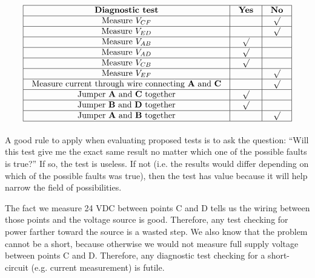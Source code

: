 $$\vbox{\offinterlineskip
\halign{\strut
\vrule \quad\hfil # \ \hfil & 
\vrule \quad\hfil # \ \hfil & 
\vrule \quad\hfil # \ \hfil \vrule \cr
\noalign{\hrule}
%
{\bf Diagnostic test} & {\bf Yes} & {\bf No} \cr
%
\noalign{\hrule}
%
Measure $V_{CF}$ &  & $\surd$ \cr
%
\noalign{\hrule}
%
Measure $V_{ED}$ &  & $\surd$ \cr
%
\noalign{\hrule}
%
Measure $V_{AB}$ & $\surd$ &  \cr
%
\noalign{\hrule}
%
Measure $V_{AD}$ & $\surd$ &  \cr
%
\noalign{\hrule}
%
Measure $V_{CB}$ & $\surd$ &  \cr
%
\noalign{\hrule}
%
Measure $V_{EF}$ &  & $\surd$ \cr
%
\noalign{\hrule}
%
Measure current through wire connecting {\bf A} and {\bf C} &  & $\surd$ \cr
%
\noalign{\hrule}
%
Jumper {\bf A} and {\bf C} together & $\surd$ &  \cr
%
\noalign{\hrule}
%
Jumper {\bf B} and {\bf D} together & $\surd$ &  \cr
%
\noalign{\hrule}
%
Jumper {\bf A} and {\bf B} together &  & $\surd$ \cr
%
\noalign{\hrule}
} %
}$$ %

A good rule to apply when evaluating proposed tests is to ask the question: ``Will this test give me the exact same result no matter which one of the possible faults is true?''  If so, the test is useless.  If not (i.e. the results would differ depending on which of the possible faults was true), then the test has value because it will help narrow the field of possibilities.







The fact we measure 24 VDC between points C and D tells us the wiring between those points and the voltage source is good.  Therefore, any test checking for power farther toward the source is a wasted step.  We also know that the problem cannot be a short, because otherwise we would not measure full supply voltage between points C and D.  Therefore, any diagnostic test checking for a short-circuit (e.g. current measurement) is futile.




